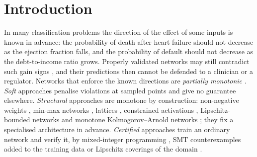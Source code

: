 \documentclass[preprint,12pt,authoryear]{elsarticle}
\begin{document}
\section{Introduction}\label{sec:intro}

In many classification problems the direction of the effect of some inputs is known in advance: the probability of
death after heart failure should not decrease as the ejection fraction falls, and the probability of default should not
decrease as the debt-to-income ratio grows. Properly validated networks may still contradict such gain signs
\citep{Sa2026}, and their predictions then cannot be defended to a clinician or a regulator. Networks that
enforce the known directions are \emph{partially monotonic} \citep{DanielsVelikova2010}. \emph{Soft} approaches
penalise violations at sampled points \citep{SillAbuMostafa1996} and give no guarantee elsewhere. \emph{Structural}
approaches are monotone by construction: non-negative weights \citep{ArcherWang1993}, min-max networks \citep{Sill1997},
lattices \citep{You2017}, constrained activations \citep{Runje2023,Sartor2025}, Lipschitz-bounded networks
\citep{Nolte2023} and monotone Kolmogorov--Arnold networks \citep{PoloMolina2026kan}; they fix a specialised
architecture in advance. \emph{Certified} approaches train an ordinary network and verify it, by mixed-integer
programming \citep{Liu2020}, SMT counterexamples added to the training data \citep{Sivaraman2020} or Lipschitz coverings
of the domain \citep{PoloMolina2026cert}.
\end{document}
